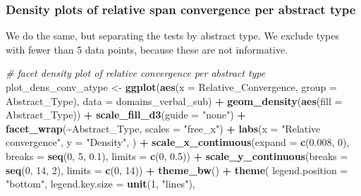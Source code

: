 \documentclass[
]{article}
\newenvironment{Shaded}{\begin{snugshade}}{\end{snugshade}}
\newcommand{\AttributeTok}[1]{\textcolor[rgb]{0.13,0.29,0.53}{#1}}
\newcommand{\CommentTok}[1]{\textcolor[rgb]{0.56,0.35,0.01}{\textit{#1}}}
\newcommand{\DecValTok}[1]{\textcolor[rgb]{0.00,0.00,0.81}{#1}}
\newcommand{\FloatTok}[1]{\textcolor[rgb]{0.00,0.00,0.81}{#1}}
\newcommand{\FunctionTok}[1]{\textcolor[rgb]{0.13,0.29,0.53}{\textbf{#1}}}
\newcommand{\NormalTok}[1]{#1}
\newcommand{\OtherTok}[1]{\textcolor[rgb]{0.56,0.35,0.01}{#1}}
\newcommand{\SpecialCharTok}[1]{\textcolor[rgb]{0.81,0.36,0.00}{\textbf{#1}}}
\newcommand{\StringTok}[1]{\textcolor[rgb]{0.31,0.60,0.02}{#1}}
\begin{document}
\subsubsection{Density plots of relative span convergence per abstract
type}\label{density-plots-of-relative-span-convergence-per-abstract-type}

We do the same, but separating the tests by abstract type. We exclude
types with fewer than 5 data points, because these are not informative.

\begin{Shaded}
\begin{Highlighting}[]
\CommentTok{\# facet density plot of relative convergence per abstract type}
\NormalTok{plot\_dens\_conv\_atype }\OtherTok{\textless{}{-}} \FunctionTok{ggplot}\NormalTok{(}\FunctionTok{aes}\NormalTok{(}\AttributeTok{x =}\NormalTok{ Relative\_Convergence, }\AttributeTok{group =}\NormalTok{ Abstract\_Type), }\AttributeTok{data =}\NormalTok{ domains\_verbal\_sub) }\SpecialCharTok{+}
  \FunctionTok{geom\_density}\NormalTok{(}\FunctionTok{aes}\NormalTok{(}\AttributeTok{fill =}\NormalTok{ Abstract\_Type)) }\SpecialCharTok{+}
  \FunctionTok{scale\_fill\_d3}\NormalTok{(}\AttributeTok{guide =} \StringTok{"none"}\NormalTok{) }\SpecialCharTok{+}
  \FunctionTok{facet\_wrap}\NormalTok{(}\SpecialCharTok{\textasciitilde{}}\NormalTok{Abstract\_Type, }\AttributeTok{scales =} \StringTok{"free\_x"}\NormalTok{) }\SpecialCharTok{+}
  \FunctionTok{labs}\NormalTok{(}\AttributeTok{x =} \StringTok{"Relative convergence"}\NormalTok{, }\AttributeTok{y =} \StringTok{"Density"}\NormalTok{, ) }\SpecialCharTok{+}
  \FunctionTok{scale\_x\_continuous}\NormalTok{(}\AttributeTok{expand =} \FunctionTok{c}\NormalTok{(}\FloatTok{0.008}\NormalTok{, }\DecValTok{0}\NormalTok{), }\AttributeTok{breaks =} \FunctionTok{seq}\NormalTok{(}\DecValTok{0}\NormalTok{, }\DecValTok{5}\NormalTok{, }\FloatTok{0.1}\NormalTok{), }\AttributeTok{limits =} \FunctionTok{c}\NormalTok{(}\DecValTok{0}\NormalTok{, }\FloatTok{0.5}\NormalTok{)) }\SpecialCharTok{+}
  \FunctionTok{scale\_y\_continuous}\NormalTok{(}\AttributeTok{breaks =} \FunctionTok{seq}\NormalTok{(}\DecValTok{0}\NormalTok{, }\DecValTok{14}\NormalTok{, }\DecValTok{2}\NormalTok{), }\AttributeTok{limits =} \FunctionTok{c}\NormalTok{(}\DecValTok{0}\NormalTok{, }\DecValTok{14}\NormalTok{)) }\SpecialCharTok{+}
  \FunctionTok{theme\_bw}\NormalTok{() }\SpecialCharTok{+}
  \FunctionTok{theme}\NormalTok{(}
    \AttributeTok{legend.position =} \StringTok{"bottom"}\NormalTok{,}
    \AttributeTok{legend.key.size =} \FunctionTok{unit}\NormalTok{(}\DecValTok{1}\NormalTok{, }\StringTok{"lines"}\NormalTok{),}

\end{Highlighting}
\end{Shaded}
\end{document}

